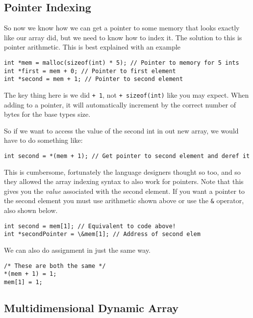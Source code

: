 \subsection{Pointer Indexing}

So now we know how we can get a pointer to some memory that looks exactly like our array did, but we need to know how to index it.
The solution to this is pointer arithmetic.
This is best explained with an example

\begin{lstlisting}
int *mem = malloc(sizeof(int) * 5); // Pointer to memory for 5 ints
int *first = mem + 0; // Pointer to first element 
int *second = mem + 1; // Pointer to second element
\end{lstlisting}

The key thing here is we did \texttt{+ 1}, not \texttt{+ sizeof(int)} like you may expect.
When adding to a pointer, it will automatically increment by the correct number of bytes for the base types size.

So if we want to access the value of the second int in out new array, we would have to do something like:

\begin{lstlisting}[numbers=none,frame=none]
int second = *(mem + 1); // Get pointer to second element and deref it
\end{lstlisting}

This is cumbersome, fortunately the language designers thought so too, and so they allowed the array indexing syntax to also work for pointers.
Note that this gives you the \emph{value} associated with the second element.
If you want a pointer to the second element you must use arithmetic shown above or use the \texttt{\&} operator, also shown below.

\begin{lstlisting}[numbers=none,frame=none]
int second = mem[1]; // Equivalent to code above!
int *secondPointer = \&mem[1]; // Address of second elem
\end{lstlisting}

We can also do assignment in just the same way.

\begin{lstlisting}
/* These are both the same */
*(mem + 1) = 1;
mem[1] = 1; 
\end{lstlisting}

\subsection{Multidimensional Dynamic Array}

